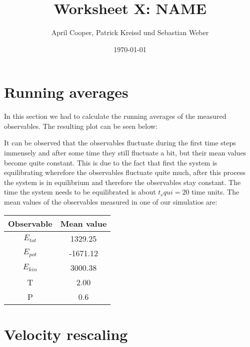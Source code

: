 \documentclass[12pt,a4paper]{scrartcl}
\author{April Cooper, Patrick Kreissl und Sebastian Weber}
\title{Worksheet X: NAME}
\date{\today}
\begin{document}
\maketitle
\tableofcontents
\newpage

\section{Running averages}
In this section we had to calculate the running averages of the measured observables.
The resulting plot can be  seen below:


It can be observed that the observables fluctuate during the first time steps immensely and after some time they still fluctuate a bit, but their mean values become quite constant. This is due to the fact that first the system is equilibrating wherefore the observables fluctuate quite much, after this process the system is in equilibrium and therefore the observables stay constant.
The time the system needs to be equilibrated is about $t_equi=20$ time units.
The mean values of the observables measured in one of our simulatios are:\newline
\\
\begin{tabular}{cc}
\toprule
Observable & Mean value\\
\midrule
$E_{tot}$&1329.25\\
$E_{pot}$&-1671.12\\
$E_{kin}$&3000.38\\
T&2.00\\
P&0.6\\
\bottomrule

\end{tabular}

\section{Velocity rescaling}
\end{document}

